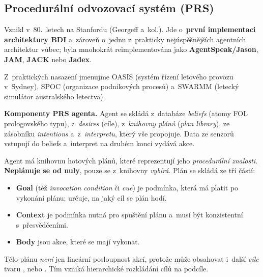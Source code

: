 \documentclass[11pt,a4paper]{article}
\theoremstyle{definition}
\begin{document}
\subsection{Procedurální odvozovací systém (PRS)}
\label{ssec:prs}

\begin{defbox}
Vznikl v~80.~letech na Stanfordu (Georgeff a~kol.). Jde o~\textbf{první implementaci architektury
BDI} a~zároveň o~jednu z~prakticky nejúspěšnějších agentních architektur vůbec; byla mnohokrát
reimplementována jako
\textbf{AgentSpeak/Jason}, \textbf{JAM}, \textbf{JACK} nebo \textbf{Jadex}.

Z~praktických nasazení jmenujme OASIS (systém řízení letového provozu v~Sydney), SPOC (organizace
podnikových procesů) a~SWARMM (letecký simulátor australského letectva).
\end{defbox}

\textbf{Komponenty PRS agenta.} Agent se skládá z~databáze \emph{beliefs} (atomy FOL prologovského
typu), z~\emph{desires} (cíle), z~\emph{knihovny plánů} (\emph{plan library}), ze zásobníku
\emph{intentions} a~z~\emph{interpretu}, který vše propojuje. Data ze senzorů vstupují do beliefs
a~interpret na druhém konci vydává akce.

\begin{defbox}
Agent má knihovnu hotových plánů, které reprezentují jeho \emph{procedurální znalosti}.
\textbf{Neplánuje se od nuly}, pouze se z~knihovny \emph{vybírá}. Plán se skládá ze tří částí:
\begin{itemize}
\item \textbf{Goal} (též \emph{invocation condition} či \emph{cue}) je podmínka, která má platit
  po vykonání plánu; určuje, na jaký cíl se plán hodí.
\item \textbf{Context} je podmínka nutná pro spuštění plánu a~musí být konzistentní
  s~přesvědčeními.
\item \textbf{Body} jsou akce, které se mají vykonat.
\end{itemize}
Tělo plánu \emph{není} jen lineární posloupnost akcí, protože může obsahovat i~další \emph{cíle}
tvaru ,  nebo .
Tím vzniká hierarchické rozkládání cílů na podcíle.
\end{defbox}
\end{document}
